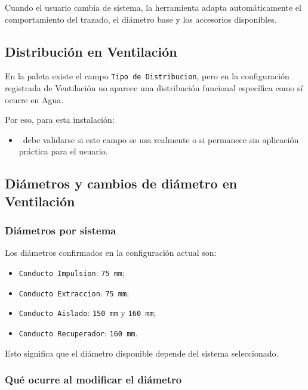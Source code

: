 Cuando el usuario cambia de sistema, la herramienta adapta automáticamente el comportamiento del trazado, el diámetro base y los accesorios disponibles.


\subsection{Distribución en Ventilación}

En la paleta existe el campo \texttt{Tipo de Distribucion}, pero en la configuración registrada de Ventilación no aparece una distribución funcional específica como sí ocurre en Agua.

Por eso, para esta instalación:

\begin{itemize}
\item \pendingtag\ debe validarse si este campo se usa realmente o si permanece sin aplicación práctica para el usuario.
\end{itemize}

\subsection{Diámetros y cambios de diámetro en Ventilación}

\subsubsection{Diámetros por sistema}

Los diámetros confirmados en la configuración actual son:

\begin{itemize}
\item \texttt{Conducto Impulsion}: \texttt{75 mm};
\item \texttt{Conducto Extraccion}: \texttt{75 mm};
\item \texttt{Conducto Aislado}: \texttt{150 mm} y \texttt{160 mm};
\item \texttt{Conducto Recuperador}: \texttt{160 mm}.
\end{itemize}

Esto significa que el diámetro disponible depende del sistema seleccionado.


\subsubsection{Qué ocurre al modificar el diámetro}


